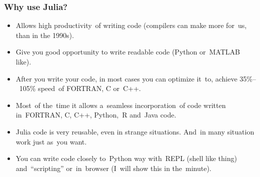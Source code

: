 \documentclass[10pt,t]{beamer}
\begin{document}
\begin{frame}
  \frametitle{Why use Julia?}


  \begin{itemize}
    \RaggedRight

  \item Allows high productivity~of writing code (compilers can make
    more for~us, than in the 1990s).

  \item Give you good opportunity to write readable code (Python
    or~MATLAB like).

  \item After you write your code, in \alert{most cases} you can
    optimize it~to, achieve 35\%--~105\% speed~of FORTRAN, C or~C++.

  \item Most~of the~time it allows a~seamless incorporation~of code
    written in~FORTRAN, C, C++, Python,~R and~Java code.

  \item Julia code is very reusable, even in strange situations.
    And~in many situation work just as~you want.

  \item You can write code closely to~Python way with~REPL (shell like
    thing) and~``scripting'' or~in~browser (I~will \alert{show} this
    in the~minute).


  \end{itemize}

\end{frame}
\end{document}
